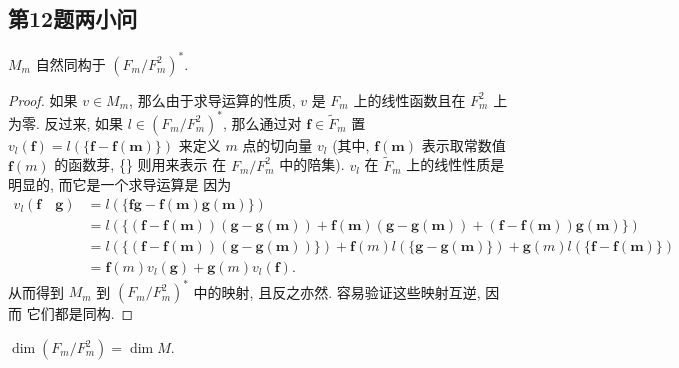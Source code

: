 \subsection{第12题两小问}
\begin{lem}
    $M_m$ 自然同构于 $(F_m/F_m^2)^*$.
\end{lem}
\begin{proof}
如果 $v \in M_m$, 那么由于求导运算的性质, $v$ 是 $F_m$ 上的线性函数且在 $F_m^2$ 上为零. 反过来, 如果 $l \in\left(F_m / F_m^2\right)^*$, 那么通过对 $\mathbf{f} \in \widetilde{F}_m$ 置 $v_l(\mathbf{f})=l(\{\mathbf{f}-\mathbf{f}(\mathbf{m})\})$ 来定义 $m$ 点的切向量 $v_l$ (其中, $\mathbf{f}(\mathbf{m})$ 表示取常数值 $\mathbf{f}(m)$ 的函数芽, \{\} 则用来表示 在 $F_m / F_m^2$ 中的陪集). $v_l$ 在 $\widetilde{F}_m$ 上的线性性质是明显的, 而它是一个求导运算是 因为
$$
\begin{aligned}
v_l(\mathbf{f} \quad \mathbf{g}) & =l(\{\mathbf{f} \mathbf{g}-\mathbf{f}(\mathbf{m}) \mathbf{g}(\mathbf{m})\}) \\
& =l(\{(\mathbf{f}-\mathbf{f}(\mathbf{m}))(\mathbf{g}-\mathbf{g}(\mathbf{m}))+\mathbf{f}(\mathbf{m})(\mathbf{g}-\mathbf{g}(\mathbf{m}))+(\mathbf{f}-\mathbf{f}(\mathbf{m})) \mathbf{g}(\mathbf{m})\}) \\
& =l(\{(\mathbf{f}-\mathbf{f}(\mathbf{m}))(\mathbf{g}-\mathbf{g}(\mathbf{m}))\})+\mathbf{f}(m) l(\{\mathbf{g}-\mathbf{g}(\mathbf{m})\})+\mathbf{g}(m) l(\{\mathbf{f}-\mathbf{f}(\mathbf{m})\}) \\
& =\mathbf{f}(m) v_{l}(\mathbf{g})+\mathbf{g}(m) v_{l} (\mathbf{f}) .
\end{aligned}
$$
从而得到 $M_m$ 到 $\left(F_m / F_m^2\right)^*$ 中的映射, 且反之亦然. 容易验证这些映射互逆, 因而 它们都是同构.
\end{proof}
\begin{thm}\label{thm:dimension equal}
$\dim\left(F_m / F_m^2\right)=\dim M$.
\end{thm}

